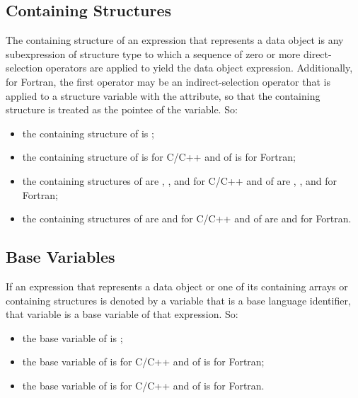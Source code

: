\subsection{Containing Structures}

The containing structure of an expression that represents a data object is any
subexpression of structure type to which a sequence of zero or more
direct-selection operators are applied to yield the data object expression.
Additionally, for Fortran, the first operator may be an indirect-selection
operator that is applied to a structure variable with the  attribute, so
that the containing structure is treated as the pointee of the variable. So:

\begin{itemize}
\item the containing structure of  is ;

\item the containing structure of  is  for C/C++ and of
       is  for Fortran;

\item the containing structures of  are ,
      , and  for C/C++ and of 
      are , , and  for
      Fortran;

\item the containing structures of  are  and
       for C/C++ and of  are  and
       for Fortran.
\end{itemize}



\subsection{Base Variables}

If an expression that represents a data object or one of its containing arrays
or containing structures is denoted by a variable that is a base language
identifier, that variable is a base variable of that expression. So:

\begin{itemize}
\item the base variable of  is ;

\item the base variable of  is  for C/C++ and of
       is  for Fortran;

\item the base variable of  is  for C/C++ and of
       is  for Fortran.
\end{itemize}

